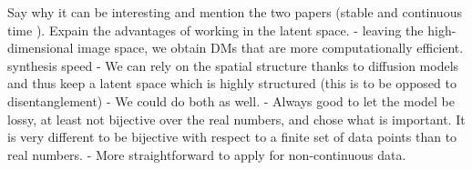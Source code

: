
Say why it can be interesting and mention the two papers (stable and continuous time ). Expain the advantages of working in the latent space.
- leaving the high-dimensional image space, we obtain DMs that are more computationally efficient. synthesis speed
- We can rely on the spatial structure thanks to diffusion models and thus keep a latent space which is highly structured (this is to be opposed to disentanglement)
- We could do both as well.
- Always good to let the model be lossy, at least not bijective over the real numbers, and chose what is important. It is very different to be bijective with respect to a finite set of data points than to real numbers.
- More straightforward to apply for non-continuous data.

